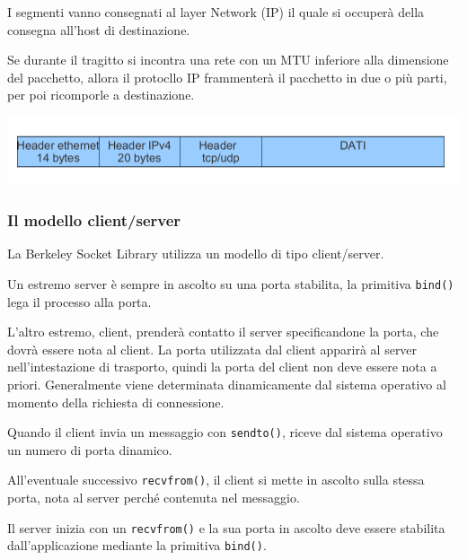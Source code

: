             I segmenti vanno consegnati al layer Network (IP) il quale si occuperà della consegna all'host di destinazione.
        
            Se durante il tragitto si incontra una rete con un MTU inferiore alla dimensione del pacchetto, allora il protocllo IP frammenterà il pacchetto in due o più parti, per poi ricomporle a destinazione.

            \begin{center}
                \includegraphics[scale=0.34]{chapters/5/assets/schema_c.png}
            \end{center}

        \subsubsection{Il modello client/server}
            La Berkeley Socket Library utilizza un modello di tipo client/server.
        
            Un estremo server è sempre in ascolto su una porta stabilita, la primitiva \verb:bind(): lega il processo alla porta.
        
            L'altro estremo, client, prenderà contatto il server specificandone la porta, che dovrà essere nota al client. La porta utilizzata dal client apparirà al server nell'intestazione di trasporto, quindi la porta del client non deve essere nota a priori. Generalmente viene determinata dinamicamente dal sistema operativo al momento della richiesta di connessione.
        
            Quando il client invia un messaggio con \verb:sendto():, riceve dal sistema operativo un numero di porta dinamico.
        
            All'eventuale successivo \verb:recvfrom():, il client si mette in ascolto sulla stessa porta, nota al server perché contenuta nel messaggio.
        
            Il server inizia con un \verb:recvfrom(): e la sua porta in ascolto deve essere stabilita dall'applicazione mediante la primitiva \verb:bind():.

